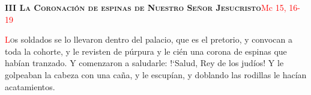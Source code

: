 \noindent\textbf{\textsc{III La Coronación de espinas de Nuestro Señor Jesucristo}}\hfill\textcolor{red}{Mc 15, 16- 19}

\vspace{0.25em}

\lettrine[lines=2]{\textcolor{red}{L}}os soldados se lo llevaron dentro del palacio, que es el pretorio, y convocan a toda la cohorte, y le revisten
de púrpura y le cién una corona de espinas que habían tranzado. Y comenzaron a saludarle: {!`}Salud, Rey de los judíos! Y le golpeaban la cabeza con
una caña, y le escupían, y doblando las rodillas le hacían acatamientos.
